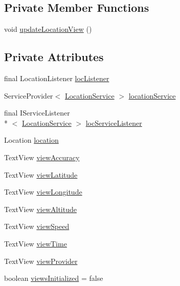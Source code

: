 \subsection*{Private Member Functions}
\begin{DoxyCompactItemize}
\item 
void \hyperlink{classcom_1_1qualoutdoor_1_1recorder_1_1home_1_1LocationFragment_a4fcaa88bffad9aaf7772832f7e9146da}{update\-Location\-View} ()
\end{DoxyCompactItemize}
\subsection*{Private Attributes}
\begin{DoxyCompactItemize}
\item 
final Location\-Listener \hyperlink{classcom_1_1qualoutdoor_1_1recorder_1_1home_1_1LocationFragment_ab494bebfd465bfe1c6e816dd84e7c1b9}{loc\-Listener}
\item 
Service\-Provider$<$ \hyperlink{classcom_1_1qualoutdoor_1_1recorder_1_1location_1_1LocationService}{Location\-Service} $>$ \hyperlink{classcom_1_1qualoutdoor_1_1recorder_1_1home_1_1LocationFragment_a1a86c1aef13ddcaec231b52af6afe9db}{location\-Service}
\item 
final I\-Service\-Listener\\*
$<$ \hyperlink{classcom_1_1qualoutdoor_1_1recorder_1_1location_1_1LocationService}{Location\-Service} $>$ \hyperlink{classcom_1_1qualoutdoor_1_1recorder_1_1home_1_1LocationFragment_aaf47723fb7dbea8b4b853226414751f9}{loc\-Service\-Listener}
\item 
Location \hyperlink{classcom_1_1qualoutdoor_1_1recorder_1_1home_1_1LocationFragment_a3dd24810ca51567a5c911196638ead94}{location}
\item 
Text\-View \hyperlink{classcom_1_1qualoutdoor_1_1recorder_1_1home_1_1LocationFragment_a004a780fe8b36290a3dd0b4d0b0139d5}{view\-Accuracy}
\item 
Text\-View \hyperlink{classcom_1_1qualoutdoor_1_1recorder_1_1home_1_1LocationFragment_a405f4a71f664401ad6e666067a015459}{view\-Latitude}
\item 
Text\-View \hyperlink{classcom_1_1qualoutdoor_1_1recorder_1_1home_1_1LocationFragment_ad07ba1fe99ac9a6bb2043a75789ccb10}{view\-Longitude}
\item 
Text\-View \hyperlink{classcom_1_1qualoutdoor_1_1recorder_1_1home_1_1LocationFragment_a060e63c443aff5bb0ad7c73cc42e5cd7}{view\-Altitude}
\item 
Text\-View \hyperlink{classcom_1_1qualoutdoor_1_1recorder_1_1home_1_1LocationFragment_acb60fef2aa9baee7c8e611d835492868}{view\-Speed}
\item 
Text\-View \hyperlink{classcom_1_1qualoutdoor_1_1recorder_1_1home_1_1LocationFragment_aa713236e64c21130b09b015bd1b75b00}{view\-Time}
\item 
Text\-View \hyperlink{classcom_1_1qualoutdoor_1_1recorder_1_1home_1_1LocationFragment_aa6c46dd3c92b8c8efcd04584b44861bf}{view\-Provider}
\item 
boolean \hyperlink{classcom_1_1qualoutdoor_1_1recorder_1_1home_1_1LocationFragment_a0be3a20b70c9d223e91aa2ddf89b28d9}{views\-Initialized} = false
\end{DoxyCompactItemize}

